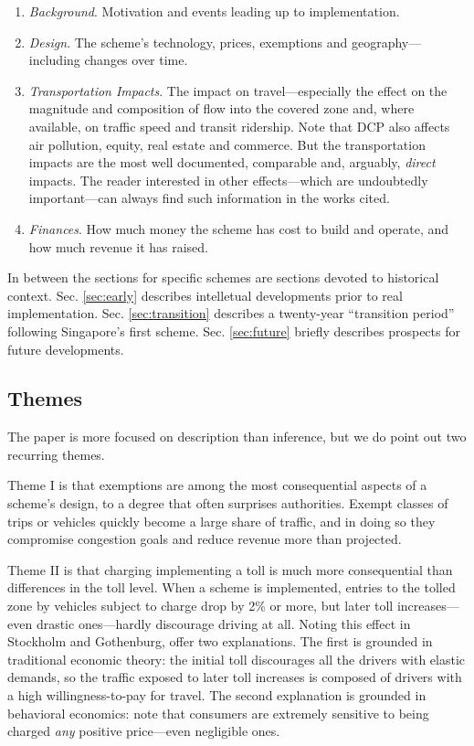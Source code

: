 \begin{enumerate}
    \item \emph{Background}. Motivation and events leading up to implementation.
    \item \emph{Design}. The scheme's technology, prices, exemptions and geography---including changes over time.
    \item \emph{Transportation Impacts}. The impact on travel---especially the effect on the magnitude and composition of flow into the covered zone and, where available, on traffic speed and transit ridership. Note that DCP also affects air pollution, equity, real estate and commerce. But the transportation impacts are the most well documented, comparable and, arguably, \emph{direct} impacts. The reader interested in other effects---which are undoubtedly important---can always find such information in the works cited.
    \item \emph{Finances}. How much money the scheme has cost to build and operate, and how much revenue it has raised.
\end{enumerate}

In between the sections for specific schemes are sections devoted to historical context. Sec. \ref{sec:early} describes intelletual developments prior to real implementation. Sec. \ref{sec:transition} describes a twenty-year ``transition period'' following Singapore's first scheme. Sec. \ref{sec:future} briefly describes prospects for future developments. 

\subsection{Themes}\label{ssec:themes}

The paper is more focused on description than inference, but we do point out two recurring themes.

Theme I is that exemptions are among the most consequential aspects of a scheme's design, to a degree that often surprises authorities. Exempt classes of trips or vehicles quickly become a large share of traffic, and in doing so they compromise congestion goals and reduce revenue more than projected.

Theme II is that charging implementing a toll is much more consequential than differences in the toll level. When a scheme is implemented, entries to the tolled zone by vehicles subject to charge drop by 2\% or more, but later toll increases---even drastic ones---hardly discourage driving at all. Noting this effect in Stockholm and Gothenburg, \citet[p. 45]{Borjesson2018} offer two explanations. The first is grounded in traditional economic theory: the initial toll discourages all the drivers with elastic demands, so the traffic exposed to later toll increases is composed of drivers with a high willingness-to-pay for travel. The second explanation is grounded in behavioral economics: \citet{Shampanier2007} note that consumers are extremely sensitive to being charged \emph{any} positive price---even negligible ones.



